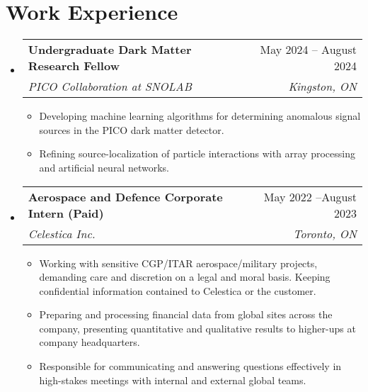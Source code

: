 \documentclass[letterpaper,11pt]{article}
\makeatletter
\newcommand{\resumeItem}[1]{
  \item\small{
    {#1 \vspace{-2pt}}
  }
}
\newcommand{\resumeSubheading}[4]{
  \vspace{-2pt}\item
    \begin{tabular*}{0.97\textwidth}[t]{l@{\extracolsep{\fill}}r}
      \textbf{#1} & #2 \\
      \textit{\small#3} & \textit{\small #4} \\
    \end{tabular*}\vspace{-7pt}
}
\newcommand{\resumeSubHeadingListStart}{\begin{itemize}[leftmargin=0.15in, label={}]}
\newcommand{\resumeSubHeadingListEnd}{\end{itemize}}
\newcommand{\resumeItemListStart}{\begin{itemize}}
\newcommand{\resumeItemListEnd}{\end{itemize}\vspace{-5pt}}
\makeatother
\begin{document}
\section{Work Experience}
  \resumeSubHeadingListStart

    \resumeSubheading
      {Undergraduate Dark Matter Research Fellow}{May 2024 -- August 2024}
      {PICO Collaboration at SNOLAB}{Kingston, ON}
      \resumeItemListStart
      \resumeItem{Developing machine learning algorithms for determining anomalous signal sources in the PICO dark matter detector.}
      \resumeItem{Refining source-localization of particle interactions with array processing and artificial neural networks.}
    \resumeItemListEnd

    \resumeSubheading
      {Aerospace and Defence Corporate Intern (Paid)}{May 2022 --August 2023}
      {Celestica Inc.}{Toronto, ON}
      \resumeItemListStart


\resumeItem{Working with sensitive CGP/ITAR aerospace/military projects, demanding care and discretion on a legal and moral basis. Keeping confidential information contained to Celestica or the customer.}
\resumeItem{Preparing and processing financial data from global sites across the company, presenting quantitative and qualitative results to higher-ups at company headquarters.}

\resumeItem{Responsible for communicating and answering questions effectively in high-stakes meetings with internal and external global teams.}

      \resumeItemListEnd
  \resumeSubHeadingListEnd
\end{document}
